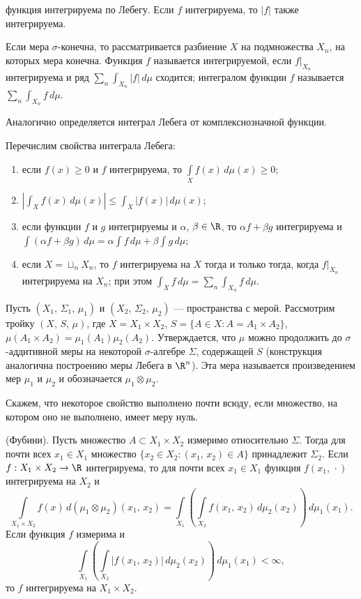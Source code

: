 \documentclass[a4paper
]{article}
\begin{document}
функция интегрируема по Лебегу. Если $f$ интегрируема, то $|f|$
также интегрируема. \par
Если мера $\sigma$-конечна, то рассматривается разбиение
$X$ на подмножества $X_n$, на которых мера конечна. Функция $f$
называется интегрируемой, если $f|_{X_n}$ интегрируема и ряд
$\sum _n \int_{X_n}|f|\, d\mu$ сходится; интегралом функции $f$
называется $\sum_n \int _{X_n}f\, d\mu$. \par
Аналогично определяется интеграл Лебега от комплекснозначной
функции. \par
Перечислим свойства интеграла Лебега:
\begin{enumerate}
\item если $f(x)\ge 0$ и $f$ интегрируема, то $\int \limits_X
f(x)\, d\mu(x)\ge 0$;
\item $\left|\int _X f(x)\, d\mu(x)\right|\le \int _X |f(x)|\, d\mu(x)$;
\item если функции $f$ и $g$ интегрируемы и $\alpha$, $\beta\in \R$,
то $\alpha f+\beta g$ интегрируема и $\int (\alpha f+\beta g)\, d\mu
=\alpha \int f\, d\mu+\beta \int g\, d\mu$;
\item если $X=\sqcup_n X_n$, то $f$ интегрируема на $X$ тогда и
только тогда, когда $f|_{X_n}$ интегрируема на $X_n$; при этом
$\int _X f\, d\mu=\sum \limits_n \int _{X_n}f\, d\mu$.
\end{enumerate}
Пусть $(X_1, \, \Sigma_1, \, \mu_1)$ и $(X_2, \, \Sigma_2, \,
\mu_2)$ --- пространства с мерой. Рассмотрим тройку $(X, \,
S, \, \mu)$, где $X=X_1\times X_2$, $S=\{A\in X: A=A_1\times A_2\}$,
$\mu(A_1\times A_2)=\mu_1(A_1)\mu_2(A_2)$. Утверждается, что
$\mu$ можно продолжить до $\sigma$-аддитивной меры на некоторой
$\sigma$-алгебре $\Sigma$, содержащей $S$ (конструкция аналогична построению
меры Лебега в $\R^n$). Эта мера называется произведением мер
$\mu_1$ и $\mu_2$ и обозначается $\mu_1\otimes \mu_2$. \par
Скажем, что некоторое свойство выполнено почти всюду,
если множество, на котором оно не выполнено, имеет меру нуль.
\begin{Trm} (Фубини). Пусть множество $A\subset X_1\times X_2$ измеримо
относительно $\Sigma$. Тогда для почти всех $x_1\in X_1$ множество
$\{x_2\in X_2:(x_1, \, x_2)\in A\}$ принадлежит $\Sigma_2$. Если
$f:X_1\times X_2\rightarrow \R$ интегрируема, то для почти всех
$x_1\in X_1$ функция $f(x_1, \, \cdot)$ интегрируема на $X_2$ и
$$\int \limits_{X_1\times X_2}f(x)\, d(\mu_1\otimes \mu_2)(x_1, \, x_2)=
\int \limits_{X_1}\left(\int \limits
_{X_2}f(x_1, \, x_2)\, d\mu_2(x_2)\right)\, d\mu_1(x_1).$$ Если
функция $f$ измерима и $$\int \limits_{X_1}\left(\int \limits
_{X_2}|f(x_1, \, x_2)|\, d\mu_2(x_2)\right)\, d\mu_1(x_1)<\infty,$$
то $f$ интегрируема на $X_1\times X_2$.
\end{Trm}
\end{document}

